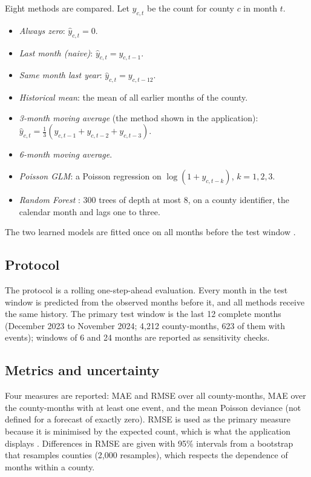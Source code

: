 \documentclass[11pt,a4paper]{article}
\begin{document}
Eight methods are compared. Let $y_{c,t}$ be the count for county $c$ in month $t$.
\begin{itemize}
  \item \emph{Always zero}: $\hat y_{c,t}=0$.
  \item \emph{Last month (naive)}: $\hat y_{c,t}=y_{c,t-1}$.
  \item \emph{Same month last year}: $\hat y_{c,t}=y_{c,t-12}$.
  \item \emph{Historical mean}: the mean of all earlier months of the county.
  \item \emph{3-month moving average} (the method shown in the application): $\hat y_{c,t}=\tfrac13(y_{c,t-1}+y_{c,t-2}+y_{c,t-3})$.
  \item \emph{6-month moving average}.
  \item \emph{Poisson GLM}: a Poisson regression on $\log(1+y_{c,t-k})$, $k=1,2,3$.
  \item \emph{Random Forest} \cite{breiman2001}: 300 trees of depth at most 8, on a county identifier, the calendar month and lags one to three.
\end{itemize}
The two learned models are fitted once on all months before the test window \cite{pedregosa2011}.

\subsection{Protocol}

The protocol is a rolling one-step-ahead evaluation. Every month in the test window is predicted from the observed months before it, and all methods receive the same history. The primary test window is the last 12 complete months (December 2023 to November 2024; 4{,}212 county-months, 623 of them with events); windows of 6 and 24 months are reported as sensitivity checks.

\subsection{Metrics and uncertainty}

Four measures are reported: MAE and RMSE over all county-months, MAE over the county-months with at least one event, and the mean Poisson deviance (not defined for a forecast of exactly zero). RMSE is used as the primary measure because it is minimised by the expected count, which is what the application displays \cite{gneiting2011}. Differences in RMSE are given with 95\% intervals from a bootstrap that resamples counties (2{,}000 resamples), which respects the dependence of months within a county.
\end{document}

